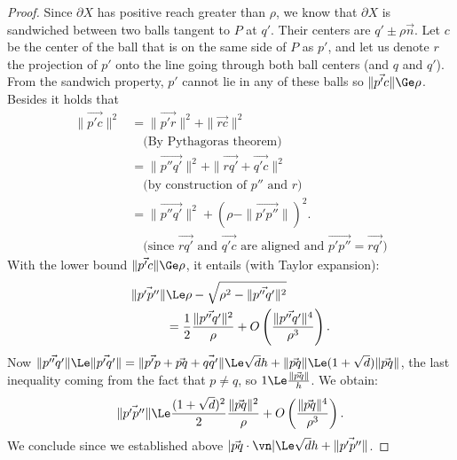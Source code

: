 \begin{proof}
    Since $\partial X$ has positive reach greater than $\rho$, we know
    that $\partial X$ is sandwiched between two balls tangent to $P$ at
    $q'$. Their centers are $q' \pm \rho \vec{n}$. Let $c$ be the center
    of the ball that is on the same side of $P$ as $p'$, and let us
    denote $r$ the projection of $p'$ onto the line going through both
    ball centers (and $q$ and $q'$). From the sandwich property, $p'$
    cannot lie in any of these balls so $\| \vec{p'c} \| \Ge
    \rho$. Besides it holds that
    \begin{align*}
        \| \vec{p'c} \|^2 & = \| \vec{{p'}r} \|^2 + \| \vec{rc} \|^2 \\
        & \quad \text{(By Pythagoras theorem)} \\
        & = \| \vec{p''q'} \|^2 + \| \vec{rq'} +\vec{q'c} \|^2 \\
        & \quad \text{(by construction of $p''$ and $r$)} \\
        & = \| \vec{p''q'} \|^2 + ( \rho - \|\vec{p'p''}\|)^2. \\
        & \quad \text{(since $\vec{rq'}$ and $\vec{q'c}$ are aligned and $\vec{p'p''}=\vec{rq'}$)}
    \end{align*}
    With the lower bound $\| \vec{p'c} \| \Ge \rho$, it entails (with Taylor expansion):
    \begin{align*}
        \|\vec{p'p''}\| & \Le \rho - \sqrt{\rho^2 - \|\vec{p''q'} \|^2} \\
        & = \frac{1}{2}\frac{\|\vec{p''q'} \|^2}{\rho} + O \left( \frac{\|\vec{p''q'} \|^4}{\rho^3} \right).
    \end{align*}
    Now $\|\vec{p''q'} \| \Le \| \vec{p'q'} \| = \| \vec{p'p} + \vec{pq}
    + \vec{qq'} \| \Le \sqrt{d}h+\|\vec{pq}\| \Le
    (1+\sqrt{d})\|\vec{pq}\|$, the last inequality coming from the fact
    that $p \neq q$, so $1 \Le \frac{\|\vec{pq}\|}{h}$. We obtain:
    \begin{align*}
        \|\vec{p'p''}\| \Le \frac{(1+\sqrt{d})^2}{2}\frac{\|\vec{pq} \|^2}{\rho} + O \left( \frac{\|\vec{pq} \|^4}{\rho^3} \right).
    \end{align*}
    We conclude since we established above $| \vec{pq} \cdot \vn | \Le
    \sqrt{d}h + \| \vec{p'p''} \|$.
\end{proof}

